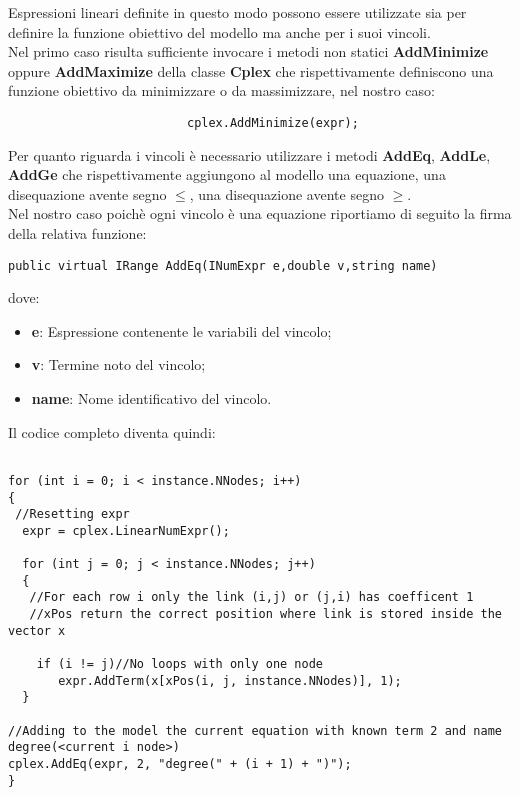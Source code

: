 \documentclass[11pt]{article}
\begin{document}
Espressioni lineari definite in questo modo possono essere utilizzate sia per definire la funzione obiettivo del modello ma anche per i suoi vincoli.\\
Nel primo caso risulta sufficiente invocare i metodi non statici \textbf{AddMinimize} oppure \textbf{AddMaximize} della classe \textbf{Cplex} che rispettivamente definiscono una funzione obiettivo da minimizzare o da massimizzare, nel nostro caso:            


\begin{lstlisting}
                         cplex.AddMinimize(expr);         
\end{lstlisting}

Per quanto riguarda i vincoli è necessario utilizzare i metodi \textbf{AddEq}, \textbf{AddLe}, \textbf{AddGe} che rispettivamente aggiungono al modello una equazione, una disequazione avente segno $\leq$, una disequazione avente segno $\geq$.\\
Nel nostro caso poichè ogni vincolo è una equazione riportiamo di seguito la firma della relativa funzione:

\begin{lstlisting}
public virtual IRange AddEq(INumExpr e,double v,string name)
\end{lstlisting}

dove:

\begin{itemize}
    \item \textbf{e}: Espressione contenente le variabili del vincolo;
    \item \textbf{v}: Termine noto del vincolo;
    \item \textbf{name}: Nome identificativo del vincolo.
\end{itemize}

Il codice completo diventa quindi:

\begin{lstlisting}

for (int i = 0; i < instance.NNodes; i++)
{
 //Resetting expr
  expr = cplex.LinearNumExpr();

  for (int j = 0; j < instance.NNodes; j++)
  {
   //For each row i only the link (i,j) or (j,i) has coefficent 1
   //xPos return the correct position where link is stored inside the vector x
    
    if (i != j)//No loops with only one node
       expr.AddTerm(x[xPos(i, j, instance.NNodes)], 1);               
  }

//Adding to the model the current equation with known term 2 and name degree(<current i node>)
cplex.AddEq(expr, 2, "degree(" + (i + 1) + ")");
}

\end{lstlisting}
\end{document}
